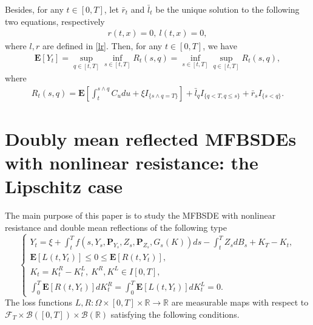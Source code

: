 \documentclass[10pt]{article}%
\numberwithin{equation}{section}
\newtheorem{theorem}{Theorem}[section]
\def \E{\mathbf{E}}
\def \P{\mathbf{P}}
\begin{document}
Besides, for any $t\in[0,T]$, let $\bar{r}_t$ and $\bar{l}_t$ be the unique solution to the following two equations, respectively
\begin{align*}
r(t,x)=0, \ l(t,x)=0,
\end{align*}
where $l,r$ are defined in \eqref{lr}. Then, for any $t\in[0,T]$, we have
\begin{align}\label{representationEYt}
\E[Y_t]=\sup_{q\in[t,T]}\inf_{s\in[t,T]}R_t(s,q)=\inf_{s\in[t,T]}\sup_{q\in[t,T]}R_t(s,q),
\end{align}
where 
\begin{align*}
R_t(s,q)=\E\left[\int_t^{s\wedge q} C_u du+\xi I_{\{s\wedge q=T\}}\right]+\bar{l}_q I_{\{q< T,q\leq s\}}+\bar{r}_s I_{\{s<q\}}.
\end{align*}
\fi



\section{Doubly mean reflected MFBSDEs with nonlinear resistance: the Lipschitz case}

The main purpose of this paper is to study the MFBSDE with nonlinear resistance and double mean reflections of the following type
\begin{equation}\label{nonlinearyz}
\begin{cases}
Y_t=\xi+\int_t^T f(s,Y_s,\P_{Y_s},Z_s,\P_{Z_s},G_s(K))ds-\int_t^T Z_s dB_s+K_T-K_t, \\
\E[L(t,Y_t)]\leq 0\leq \E[R(t,Y_t)], \\
K_t=K^R_t-K^L_t,\ K^R,K^L\in I[0,T],\\
\int_0^T \E[R(t,Y_t)]dK_t^R=\int_0^T \E[L(t,Y_t)]dK^L_t=0.
\end{cases}
\end{equation}
The loss functions $L,R:\Omega\times [0,T]\times\mathbb{R}\rightarrow \mathbb{R}$ are measurable maps with respect to $\mathcal{F}_T\times \mathcal{B}([0,T])\times \mathcal{B}(\mathbb{R})$ satisfying the following conditions.
\end{document}
